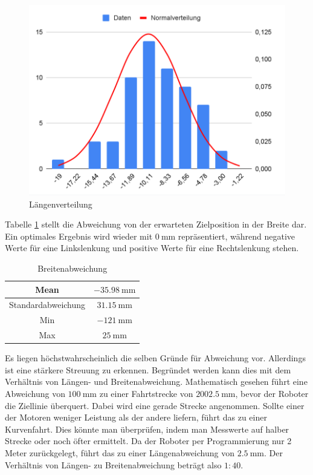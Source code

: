 \documentclass[ngerman]{tudscrreprt}
\begin{document}
\begin{figure}[H]
    \centering
    \includegraphics[scale=0.5]{images/laengenverteilung.png}
    \caption{Längenverteilung}
    \label{figure:laengenverteilung}
\end{figure}
%
Tabelle \ref{table:breitenabweichung} stellt die Abweichung von der erwarteten Zielposition in der Breite dar. Ein optimales Ergebnis wird wieder mit $\SI{0}{\mm}$ repräsentiert, während negative Werte für eine Linkslenkung und positive Werte für eine Rechtslenkung stehen.
%
\begin{table}[H]
    \centering
    \begin{tabular}{|c|c|}
    \hline
    Mean               & $\SI{-35,98}{\mm}$ \\ \hline
    Standardabweichung & $\SI{31,15}{\mm}$ \\ \hline
    Min                & $\SI{-121}{\mm}$ \\ \hline
    Max                & $\SI{25}{\mm}$ \\ \hline
    \end{tabular}
    \caption{Breitenabweichung}
    \label{table:breitenabweichung}
\end{table}
%
Es liegen höchstwahrscheinlich die selben Gründe für Abweichung vor. Allerdings ist eine stärkere Streuung zu erkennen. Begründet werden kann dies mit dem Verhältnis von Längen- und Breitenabweichung. Mathematisch gesehen führt eine Abweichung von $\SI{100}{\mm}$ zu einer Fahrtstrecke von $\SI{2002,5}{\mm}$, bevor der Roboter die Ziellinie überquert. Dabei wird eine gerade Strecke angenommen. Sollte einer der Motoren weniger Leistung als der andere liefern, führt das zu einer Kurvenfahrt. Dies könnte man überprüfen, indem man Messwerte auf halber Strecke oder noch öfter ermittelt. Da der Roboter per Programmierung nur 2 Meter zurückgelegt, führt das zu einer Längenabweichung von $\SI{2,5}{\mm}$. Der Verhältnis von Längen- zu Breitenabweichung beträgt also $1:40$.
\end{document}
